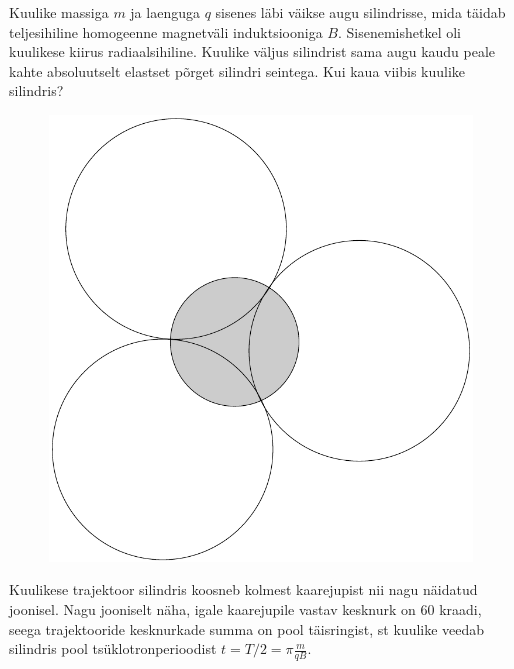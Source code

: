 \setAuthor{}

Kuulike massiga $m$ ja laenguga $q$ sisenes läbi väikse augu silindrisse, mida täidab teljesihiline homogeenne magnetväli induktsiooniga $B$. Sisenemishetkel oli kuulikese kiirus radiaalsihiline. Kuulike väljus silindrist sama augu kaudu peale kahte absoluutselt elastset põrget silindri seintega. Kui kaua viibis kuulike silindris? 
\vspace{-5pt}


\hint

\solu
\begin{figure}
  \vspace{-25pt}
  \begin{center}
\includegraphics[scale=0.3]{2019-v3g-06-yl.pdf}
  \end{center}
  \vspace{-20pt}
\end{figure}

Kuulikese trajektoor silindris koosneb kolmest kaarejupist nii nagu näidatud joonisel. Nagu jooniselt näha, igale kaarejupile vastav kesknurk on 60 kraadi, seega trajektooride kesknurkade summa on pool täisringist, st kuulike veedab silindris pool tsüklotronperioodist  $t=T/2=\pi\frac m{qB}$.
\probend